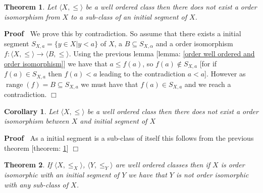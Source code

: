 \documentclass{book}
\newcommand{\nin}{\not\in}
\newcommand{\tmop}[1]{\ensuremath{\operatorname{#1}}}
\newenvironment{proof}{\noindent\textbf{Proof\ }}{\hspace*{\fill}$\Box$\medskip}
\newtheorem{corollary}{Corollary}
\newtheorem{theorem}{Theorem}
\begin{document}
\begin{theorem}
  \label{order well ordered class and isomorphism}Let $\langle X, \leqslant
  \rangle$ be a well ordered class then there does not exist a order
  isomorphism from $X$ to a sub-class of an initial segment of $X$.
\end{theorem}

\begin{proof}
  We prove this by contradiction. So assume that there exists a initial
  segment $S_{X, a} = \{ y \in X|y < a \}$ of $X$, a $B \subseteq S_{X,
  \alpha}$ and a order isomorphism $f : \langle X, \leqslant \rangle
  \rightarrow \langle B, \leqslant \rangle$. Using the previous lemma [lemma:
  \ref{order well ordered and order isomorphism}] we have that $a \leqslant f
  (a)$, so $f (a) \nin S_{X, a}$ [for if $f (a) \in S_{X, a}$ then $f (a) < a$
  leading to the contradiction $a < a$]. However as $\tmop{range} (f) = B
  \subseteq S_{X, a}$ we must have that $f (a) \in S_{X, a}$ and we reach a
  contradiction.
\end{proof}

\begin{corollary}
  \label{order well ordered is not isomorph to a initial segment }Let $\langle
  X, \leqslant \rangle$ be a well ordered class then there does not exist a
  order isomorphism between $X$ and initial segment of $X$
\end{corollary}

\begin{proof}
  As a initial segment is a sub-class of itself this follows from the previous
  theorem [theorem: \ref{order well ordered class and isomorphism}]
\end{proof}

\begin{theorem}
  \label{order well ordered isomorphism property}If $\langle X, \leqslant_X
  \rangle$, $\langle Y, \leqslant_Y \rangle$ are well ordered classes then if
  $X$ is order isomorphic with an initial segment of $Y$ we have that $Y$ is
  not order isomorphic with any sub-class of $X$.
\end{theorem}
\end{document}
